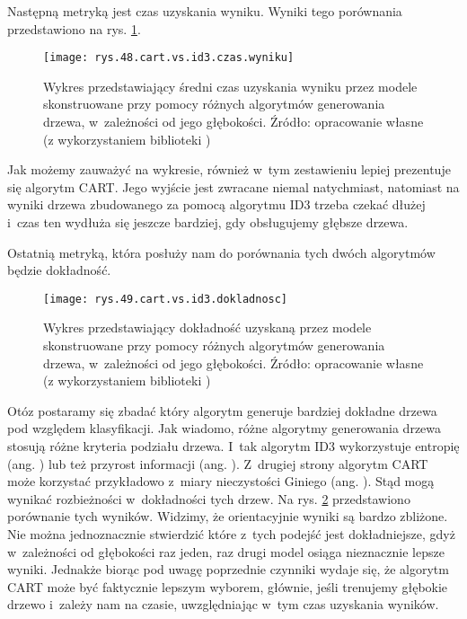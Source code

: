 Następną metryką jest czas uzyskania wyniku. Wyniki tego porównania przedstawiono na rys. \ref{rys.48.cart.vs.id3.czas.wyniku}. 
\begin{figure}[h]
    \centering
    \texttt{[image: rys.48.cart.vs.id3.czas.wyniku]}
    \caption{Wykres przedstawiający średni czas uzyskania wyniku przez modele skonstruowane przy pomocy różnych algorytmów generowania drzewa, w~zależności od jego głębokości. Źródło: opracowanie własne (z wykorzystaniem biblioteki )}
    \label{rys.48.cart.vs.id3.czas.wyniku}
\end{figure}
Jak możemy zauważyć na wykresie, również w~tym zestawieniu lepiej prezentuje się algorytm CART. Jego wyjście jest zwracane niemal natychmiast, natomiast na wyniki drzewa zbudowanego za pomocą algorytmu ID3 trzeba czekać dłużej i~czas ten wydłuża się jeszcze bardziej, gdy obsługujemy głębsze drzewa. 

Ostatnią metryką, która posłuży nam do porównania tych dwóch algorytmów będzie dokładność. 
\begin{figure}[h]
    \centering
    \texttt{[image: rys.49.cart.vs.id3.dokladnosc]}
    \caption{Wykres przedstawiający dokładność uzyskaną przez modele skonstruowane przy pomocy różnych algorytmów generowania drzewa, w~zależności od jego głębokości. Źródło: opracowanie własne (z wykorzystaniem biblioteki )}
    \label{rys.49.cart.vs.id3.dokladnosc}
\end{figure}
Otóz postaramy się zbadać który algorytm generuje bardziej dokładne drzewa pod względem klasyfikacji. 
Jak wiadomo, różne algorytmy generowania drzewa stosują różne kryteria podziału drzewa. I~tak algorytm ID3 wykorzystuje entropię (ang. ) lub też przyrost informacji (ang. ). Z~drugiej strony algorytm CART może korzystać przykładowo z~miary nieczystości Giniego (ang. ). Stąd mogą wynikać rozbieżności w~dokładności tych drzew. Na rys. \ref{rys.49.cart.vs.id3.dokladnosc} przedstawiono porównanie tych wyników. 
Widzimy, że orientacyjnie wyniki są bardzo zbliżone. Nie można jednoznacznie stwierdzić które z~tych podejść jest dokładniejsze, gdyż w~zależności od głębokości raz jeden, raz drugi model osiąga nieznacznie lepsze wyniki. Jednakże biorąc pod uwagę poprzednie czynniki wydaje się, że algorytm CART może być faktycznie lepszym wyborem, głównie, jeśli trenujemy głębokie drzewo i~zależy nam na czasie, uwzględniając w~tym czas uzyskania wyników.

